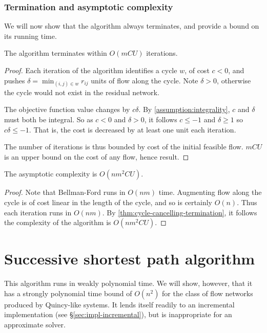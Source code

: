 \subsubsection{Termination and asymptotic complexity}

We will now show that the algorithm always terminates, and provide a bound on its running time.\\

\begin{thm} \label{thm:cycle-cancelling-termination}
The algorithm terminates within $O(mCU)$ iterations.
\end{thm}
\begin{proof}
Each iteration of the algorithm identifies a cycle $w$, of cost $c < 0$, and pushes $\delta = \min_{(i,j) \in w} r_{ij}$ units of flow along the cycle. Note $\delta > 0$, otherwise the cycle would not exist in the residual network. 

The objective function value changes by $c\delta$.  By \cref{assumption:integrality}, $c$ and $\delta$ must both be integral. So as $c < 0$ and $\delta > 0$, it follows $c \leq -1$ and $\delta \geq 1$ so $c\delta \leq -1$. That is, the cost is decreased by at least one unit each iteration.

The number of iterations is thus bounded by cost of the initial feasible flow. $mCU$ is an upper bound on the cost of any flow, hence result.
\end{proof}

\begin{cor} \label{corollary:cycle-cancelling-complexity}
The asymptotic complexity is $O(nm^2CU)$.
\end{cor}
\begin{proof}
Note that Bellman-Ford runs in $O(nm)$ time. Augmenting flow along the cycle is of cost linear in the length of the cycle, and so is certainly $O(n)$. Thus each iteration runs in $O(nm)$. By \cref{thm:cycle-cancelling-termination}, it follows the complexity of the algorithm is $O(nm^2CU)$.
\end{proof}

\section{Successive shortest path algorithm} \label{sec:impl-ssp}

This algorithm runs in weakly polynomial time. We will show, however, that it has a strongly polynomial time bound of $O(n^2)$ for the class of flow networks produced by Quincy-like systems. It lends itself readily to an incremental implementation (see \S\ref{sec:impl-incremental}), but is inappropriate for an approximate solver.

